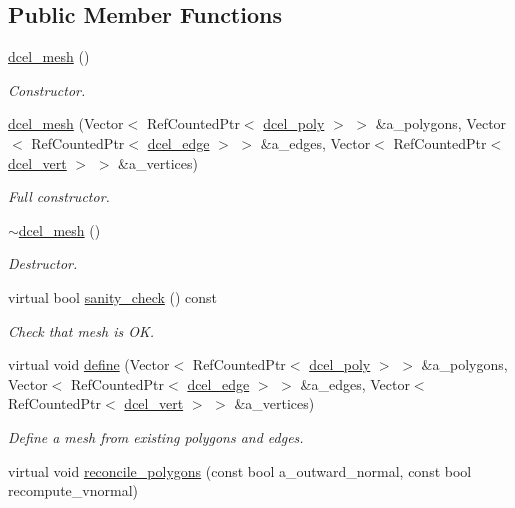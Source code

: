 \subsection*{Public Member Functions}
\begin{DoxyCompactItemize}
\item 
\hyperlink{classdcel__mesh_ab2bd0599350f49c36964973c0a33a31f}{dcel\+\_\+mesh} ()
\begin{DoxyCompactList}\small\item\em Constructor. \end{DoxyCompactList}\item 
\hyperlink{classdcel__mesh_a4cde2c1cfceb41454304f154a5790e0a}{dcel\+\_\+mesh} (Vector$<$ Ref\+Counted\+Ptr$<$ \hyperlink{classdcel__poly}{dcel\+\_\+poly} $>$ $>$ \&a\+\_\+polygons, Vector$<$ Ref\+Counted\+Ptr$<$ \hyperlink{classdcel__edge}{dcel\+\_\+edge} $>$ $>$ \&a\+\_\+edges, Vector$<$ Ref\+Counted\+Ptr$<$ \hyperlink{classdcel__vert}{dcel\+\_\+vert} $>$ $>$ \&a\+\_\+vertices)
\begin{DoxyCompactList}\small\item\em Full constructor. \end{DoxyCompactList}\item 
\hyperlink{classdcel__mesh_a6454ac64927d4e2d8b446e8f85fbb927}{$\sim$dcel\+\_\+mesh} ()
\begin{DoxyCompactList}\small\item\em Destructor. \end{DoxyCompactList}\item 
virtual bool \hyperlink{classdcel__mesh_af5fdbe89171474d5339c0b027780b7d4}{sanity\+\_\+check} () const 
\begin{DoxyCompactList}\small\item\em Check that mesh is OK. \end{DoxyCompactList}\item 
virtual void \hyperlink{classdcel__mesh_a3548cdd3b1fe6f27740761f49bed43c4}{define} (Vector$<$ Ref\+Counted\+Ptr$<$ \hyperlink{classdcel__poly}{dcel\+\_\+poly} $>$ $>$ \&a\+\_\+polygons, Vector$<$ Ref\+Counted\+Ptr$<$ \hyperlink{classdcel__edge}{dcel\+\_\+edge} $>$ $>$ \&a\+\_\+edges, Vector$<$ Ref\+Counted\+Ptr$<$ \hyperlink{classdcel__vert}{dcel\+\_\+vert} $>$ $>$ \&a\+\_\+vertices)
\begin{DoxyCompactList}\small\item\em Define a mesh from existing polygons and edges. \end{DoxyCompactList}\item 
virtual void \hyperlink{classdcel__mesh_a0a3aaac5be97e7876517b2d067fcbb7e}{reconcile\+\_\+polygons} (const bool a\+\_\+outward\+\_\+normal, const bool recompute\+\_\+vnormal)

\end{DoxyCompactItemize}
